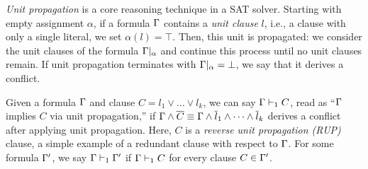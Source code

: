 %
%
%
\emph{Unit propagation} is a core reasoning technique in a SAT solver. Starting
with empty assignment $\alpha$, if a formula $\Gamma$ contains a \emph{unit
clause} $l$, i.e., a clause with only a single literal, we set $\alpha(l) =
\top$. Then, this unit is propagated: we consider the unit clauses of the formula $\Gamma|_\alpha$
and continue this process until no unit clauses remain. If unit propagation
terminates with $\Gamma|_\alpha = \bot$, we say that it derives a conflict.
%
%

Given a formula $\Gamma$ and clause $C = l_1 \lor \dots \lor l_k$, we can say
$\Gamma \vdash_1 C$, read as ``$\Gamma$ implies $C$ via unit propagation,''
if $\Gamma \land \overline{C} \equiv \Gamma \land \overline{l}_1 \land \dots
\land \overline{l}_k$ derives a conflict after applying unit propagation. 
Here, $C$ is a \emph{reverse unit propagation (RUP)}
clause, a simple example of a redundant clause with respect to $\Gamma$. For some formula
$\Gamma'$, we say $\Gamma \vdash_1 \Gamma'$ if $\Gamma \vdash_1 C$ for every 
clause $C \in \Gamma'$.


